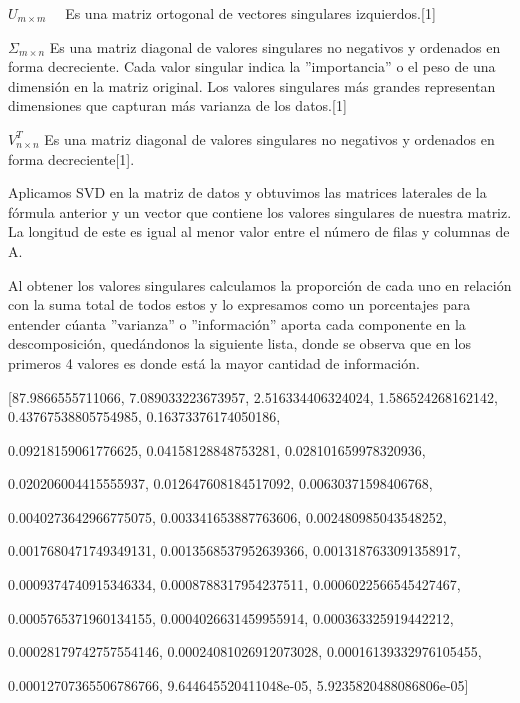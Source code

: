 \documentclass[a4paper,10pt,twocolumn]{article}
\begin{document}
\begin{description}
			\item $U_{m \times m} \quad$ Es una matriz ortogonal de vectores singulares izquierdos.[1]
			\item $\Sigma_{m \times n}$ Es una matriz diagonal de valores singulares no negativos y ordenados en forma decreciente. Cada valor singular indica la ”importancia” o el peso de una dimensión en la matriz original. Los valores singulares más grandes representan dimensiones que capturan más varianza de los datos.[1]
            \item $V^T_{n \times n}$ Es una matriz diagonal de valores singulares no negativos y ordenados en forma decreciente[1].\\
		\end{description}

Aplicamos SVD en la matriz de datos y obtuvimos las matrices laterales de la fórmula anterior y un vector que contiene los valores singulares de nuestra matriz. La longitud de este es igual al menor valor entre el número de filas y columnas de A.

Al obtener los valores singulares calculamos la proporción de cada uno en relación con la suma total de todos estos y lo expresamos como un porcentajes para entender cúanta ”varianza” o ”información” aporta cada componente en la descomposición, quedándonos la siguiente lista, donde se observa que en los primeros 4 valores es donde está la mayor cantidad de información.

[87.9866555711066, 7.089033223673957,             2.516334406324024,
1.586524268162142, 0.43767538805754985, 0.16373376174050186,

0.09218159061776625, 0.04158128848753281, 0.028101659978320936,

0.020206004415555937, 0.012647608184517092, 0.00630371598406768,

0.0040273642966775075, 0.003341653887763606, 0.002480985043548252,

0.0017680471749349131, 0.0013568537952639366, 0.0013187633091358917,

0.0009374740915346334, 0.0008788317954237511, 0.0006022566545427467,

0.0005765371960134155, 0.0004026631459955914, 0.000363325919442212,

0.00028179742757554146, 0.00024081026912073028, 0.00016139332976105455,

0.00012707365506786766, 9.644645520411048e-05, 5.9235820488086806e-05]
\end{document}
